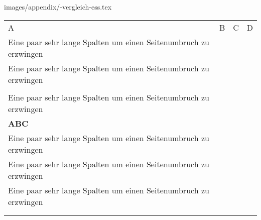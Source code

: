 \begin{filecontents}[overwrite]{images/appendix/\jobname-vergleich-ess.tex}
    \begin{longtable}{XXXX}
        \small \singlespacing
        \\ \hline \rowcolor{lightgray} 
        A & B & C & D \\ \hline \endhead
        Eine paar sehr lange Spalten um einen Seitenumbruch zu erzwingen & & & \\ \hline
        Eine paar sehr lange Spalten um einen Seitenumbruch zu erzwingen & & & \\ \hline
        & & & \\ \hline
        Eine paar sehr lange Spalten um einen Seitenumbruch zu erzwingen & & & \\ \hline
        \rowcolor{light-green} \textbf{ABC} & & & \\ \hline
        Eine paar sehr lange Spalten um einen Seitenumbruch zu erzwingen & & & \\ \hline
        Eine paar sehr lange Spalten um einen Seitenumbruch zu erzwingen & & & \\ \hline
        Eine paar sehr lange Spalten um einen Seitenumbruch zu erzwingen & & & \\ \hline
        & & & \\ \hline
        & & & \\ \hline
    \end{longtable}
\end{filecontents} 
